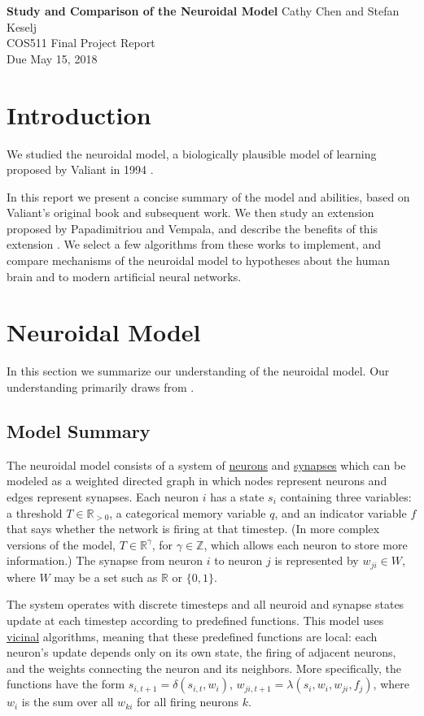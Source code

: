 \documentclass[letterpaper, 12pt]{article}
\begin{document}
\noindent
\textbf{Study and Comparison of the Neuroidal Model} \hfill \newline Cathy Chen and Stefan Keselj \\
COS511 Final Project Report \\
Due May 15, 2018

\section*{Introduction}
We studied the neuroidal model, a biologically plausible model of learning proposed by Valiant in 1994 \cite{valiant_circuits_1994}. 

In this report we present a concise summary of the model and abilities, based on Valiant's original book and subsequent work. We then study an extension proposed by Papadimitriou and Vempala, and describe the benefits of this extension \cite{papadimitriou_cortical_2015}. We select a few algorithms from these works to implement, and compare mechanisms of the neuroidal model to hypotheses about the human brain and to modern artificial neural networks.

\section*{Neuroidal Model}
In this section we summarize our understanding of the neuroidal model. Our understanding primarily draws from \cite{valiant_circuits_1994, valiant_memorization_2005, papadimitriou_cortical_2015}.

\subsection*{Model Summary}
The neuroidal model consists of a system of \underline{neurons} and \underline{synapses} which can be modeled as a weighted directed graph in which nodes represent neurons and edges represent synapses. Each neuron $i$ has a state $s_i$ containing three variables: a threshold $T\in\mathbb{R}_{>0}$, a categorical memory variable $q$, and an indicator variable $f$ that says whether the network is firing at that timestep. (In more complex versions of the model, $T\in\mathbb{R}^\gamma$, for $\gamma\in\mathbb{Z}$, which allows each neuron to store more information.) The synapse from neuron $i$ to neuron $j$ is represented by $w_{ji}\in W$, where $W$ may be a set such as $\mathbb{R}$ or $\{0,1\}$.

The system operates with discrete timesteps and all neuroid and synapse states update at each timestep according to predefined functions. This model uses \underline{vicinal} algorithms, meaning that these predefined functions are local: each neuron's update depends only on its own state, the firing of adjacent neurons, and the weights connecting the neuron and its neighbors. More specifically, the functions have the form $s_{i,t+1}=\delta(s_{i,t},w_i)$, $w_{ji,t+1}=\lambda(s_i,w_i,w_{ji},f_j)$, where $w_i$ is the sum over all $w_{ki}$ for all firing neurons $k$.
\end{document}

